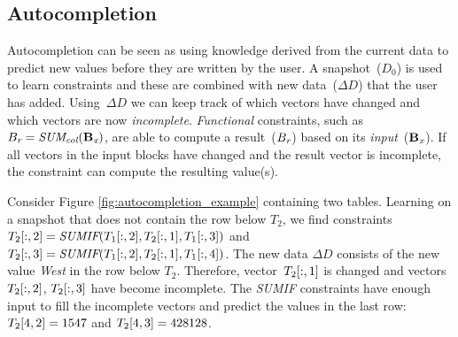 \subsection{Autocompletion}
Autocompletion can be seen as using knowledge derived from the current data to predict new values before they are written by the user.
A snapshot~($D_0$) is used to learn constraints and these are combined with new data~($\Delta D$) that the user has added.
Using~$\Delta D$ we can keep track of which vectors have changed and which vectors are now \textit{incomplete}.
\textit{Functional} constraints, such as $B_{\textit{r}} = \textit{SUM\textsubscript{col}}(\mathbf{B_{\textit{x}}})$, are able to compute a result~($B_{\textit{r}}$) based on its \textit{input}~($\mathbf{B_{\textit{x}}}$).
If all vectors in the input blocks have changed and the result vector is incomplete, the constraint can compute the resulting value(s).

Consider Figure \ref{fig:autocompletion_example} containing two tables.
Learning on a snapshot that does not contain the row below $T_2$, we find constraints $T_2[:,2] = \textit{SUMIF}(T_1[:,2], T_2[:,1], T_1[:,3])$ and $T_2[:,3] = \textit{SUMIF}(T_1[:,2], T_2[:,1], T_1[:,4])$.
The new data $\Delta D$ consists of the new value \textit{West} in the row below $T_2$.
Therefore, vector~$T_2[:,1]$ is changed and vectors~$T_2[:,2]$, $T_2[:,3]$ have become incomplete.
The \textit{SUMIF} constraints have enough input to fill the incomplete vectors and predict the values in the last row: $T_2[4,2] = 1547$ and $T_2[4,3] = 428128$.


